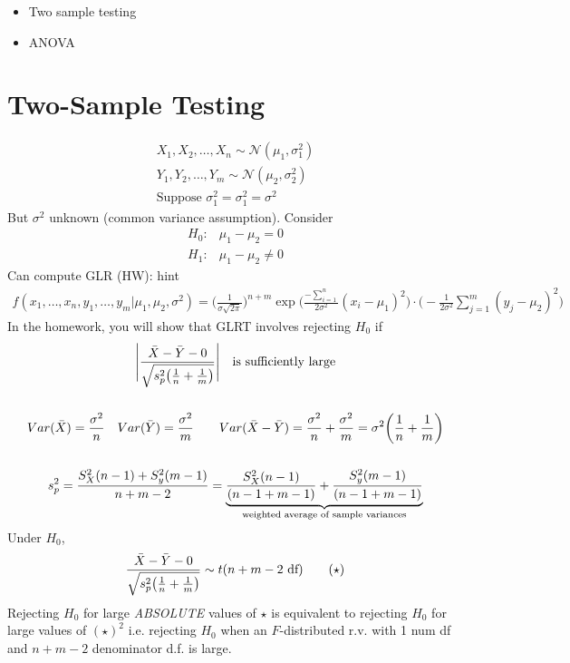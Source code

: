 \begin{itemize}
	\item Two sample testing
	\item ANOVA
\end{itemize}
\section*{Two-Sample Testing}
\begin{gather*}
		X_1, X_2, \ldots, X_n \sim \mathcal{N}(\mu_1, \sigma_1^2)\\
	Y_1, Y_2, \ldots, Y_m \sim \mathcal{N}(\mu_2, \sigma_2^2)\\
	\text{Suppose } \sigma_1^2 = \sigma_1^2 = \sigma^2
\end{gather*}
But $\sigma^2$ unknown (common variance assumption). Consider
\begin{align*}
	H_0: & \mu_1 - \mu_2 = 0\\
	H_1: & \mu_1 - \mu_2 \neq 0
\end{align*}
Can compute GLR (HW): hint
\begin{gather*}
	f(x_1, \ldots, x_n, y_1, \ldots, y_m | \mu_1, \mu_2, \sigma^2) = \bigg( \frac{1}{\sigma\sqrt{2\pi}}\bigg)^{n+m} \exp \bigg( 
	\frac{-\sum_{i=1}^n}{2\sigma^2} (x_i - \mu_1)^2 \bigg) \cdot \bigg( -\frac{1}{2\sigma^2} \sum_{j=1}^m (y_j - \mu_2)^2  \bigg)
\end{gather*}
In the homework, you will show that GLRT involves rejecting $H_0$ if 
\begin{gather*}
	\Bigg| 
	\frac{\bar{X} - \bar{Y} - 0}{\sqrt{s_p^2 \big(\frac{1}{n} + \frac{1}{m} \big)}} \Bigg| \quad \text{is sufficiently large}\\\\
	Var(\bar{X}) = \frac{\sigma^2}{n} \quad 	Var(\bar{Y}) = \frac{\sigma^2}{m} \qquad 	Var(\bar{X} - \bar{Y}) = \frac{\sigma^2}{n} + \frac{\sigma^2}{m} = \sigma^2\bigg(\frac{1}{n} + \frac{1}{m}\bigg)\\\\
	s_p^2 = \frac{S_X^2 (n-1) + S_y^2 (m-1)}{n+m-2} = \underbrace{\frac{S_X^2 (n-1)}{(n-1+m-1)} + \frac{S_y^2 (m-1)}{(n-1 + m-1)}}_{\text{weighted average of sample variances}}
\end{gather*}
Under $H_0$, 
\begin{gather*}
	\frac{\bar{X} - \bar{Y} - 0}{\sqrt{s_p^2 \big(\frac{1}{n} + \frac{1}{m} \big)}} \sim t(n+m-2 \text{ df}) \tag{$\star$}
\end{gather*}
Rejecting $H_0$ for large \emph{ABSOLUTE} values of $\star$ is equivalent to rejecting $H_0$ for large values of $(\star)^2$ i.e. rejecting $H_0$ when an $F$-distributed r.v. with 1 num df and $n+m-2$ denominator d.f. is large.

